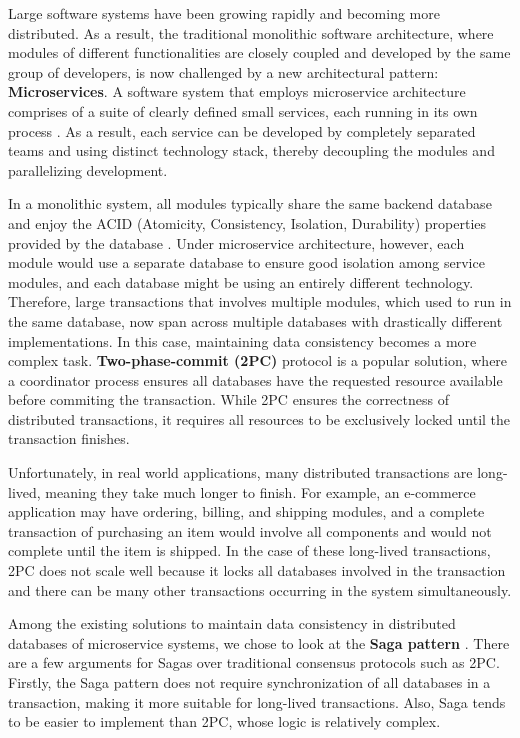 Large software systems have been growing rapidly and becoming more distributed. As a result, the traditional monolithic software architecture, where modules of different functionalities are closely coupled and developed by the same group of developers, is now challenged by a new architectural pattern: \textbf{Microservices}. A software system that employs microservice architecture comprises of a suite of clearly defined small services, each running in its own process \cite{lewis2014microservices}. As a result, each service can be developed by completely separated teams and using distinct technology stack, thereby decoupling the modules and parallelizing development.

In a monolithic system, all modules typically share the same backend database and enjoy the ACID (Atomicity, Consistency, Isolation, Durability) properties provided by the database \cite{gray1981transaction}. Under microservice architecture, however, each module would use a separate database to ensure good isolation among service modules, and each database might be using an entirely different technology. Therefore, large transactions that involves multiple modules, which used to run in the same database, now span across multiple databases with drastically different implementations. In this case, maintaining data consistency becomes a more complex task. \textbf{Two-phase-commit (2PC)} protocol \cite{bernstein1987concurrency} is a popular solution, where a coordinator process ensures all databases have the requested resource available before commiting the transaction. While 2PC ensures the correctness of distributed transactions, it requires all resources to be exclusively locked until the transaction finishes.

Unfortunately, in real world applications, many distributed transactions are long-lived, meaning they take much longer to finish. For example, an e-commerce application may have ordering, billing, and shipping modules, and a complete transaction of purchasing an item would involve all components and would not complete until the item is shipped. In the case of these long-lived transactions, 2PC does not scale well because it locks all databases involved in the transaction and there can be many other transactions occurring in the system simultaneously.

Among the existing solutions to maintain data consistency in distributed databases of microservice systems, we chose to look at the \textbf{Saga pattern} \cite{garcia1987sagas}. There are a few arguments for Sagas over traditional consensus protocols such as 2PC. Firstly, the Saga pattern does not require synchronization of all databases in a transaction, making it more suitable for long-lived transactions. Also, Saga tends to be easier to implement than 2PC, whose logic is relatively complex.
